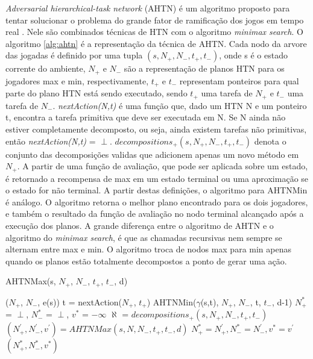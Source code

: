 \textit{Adversarial hierarchical-task network} (AHTN) é um algoritmo proposto para tentar solucionar o problema do grande fator de ramificação dos jogos em tempo real \cite{ontanon2015adversarial}. Nele são combinados técnicas de HTN com o algoritmo \textit{minimax search}. O algoritmo \ref{alg:ahtn} é a representação da técnica de AHTN. Cada nodo da arvore das jogadas é definido por uma tupla $(s, N_{+}, N_{-}, t_{+}, t_{-})$, onde s é o estado corrente do ambiente, $N_{+}$ e $N_{-}$ são a representação de planos HTN para os jogadores max e min, respectivamente, $t_{+}$ e $t_{-}$ representam ponteiros para qual parte do plano HTN está sendo executado, sendo  $t_{+}$ uma tarefa de $N_{+}$ e $t_{-}$ uma tarefa de $N_{-}$. \textit{nextAction(N,t)} é uma função que, dado um HTN N e um ponteiro t, encontra a tarefa primitiva que deve ser executada em N. Se N ainda não estiver completamente decomposto, ou seja, ainda existem tarefas não primitivas, então \textit{nextAction(N,t)} = $\perp$.  $decompositions_{+}(s, N_{+}, N_{-}, t_{+}, t_{-})$ denota o conjunto das decomposições validas que adicionem apenas um novo método em $N_{+}$. A partir de uma função de avaliação, que pode ser aplicada sobre um estado, é retornado a recompensa de max em um estado terminal ou uma aproximação se o estado for não terminal. A partir destas definições, o algoritmo para AHTNMin é análogo. O algoritmo retorna o melhor plano encontrado para os dois jogadores, e também o resultado da função de avaliação no nodo terminal alcançado após a execução dos planos. A grande diferença entre o algoritmo de AHTN e o algoritmo do \textit{minimax search}, é que as chamadas recursivas nem sempre se alternam entre max e min. O algoritmo troca de nodos max para min apenas quando os planos estão totalmente decompostos a ponto de gerar uma ação. 

\begin{algorithm}
	\caption{AHTNMax(s, $N_{+}$, $N_{-}$, $t_{+}$, $t_{-}$, d)}
	\label{alg:ahtn}
	\begin{algorithmic}[1]
		\State	\Return ($N_{+}$, $N_{-}$, e(s))
		\EndIf
		\State t = nextAction($N_{+}$, $t_{+}$) 
		\State \Return AHTNMin($\gamma$(s,t), $N_{+}$, $N_{-}$, t, $t_{-}$, d-1)
		\EndIf
		\State $N_{+}^{*}$ = $\perp$, $N_{-}^{*}$ = $\perp$, $v^{*}$ = $-\infty$
		\State $\aleph$ = $decompositions_{+}(s, N_{+}, N_{-}, t_{+}, t_{-})$
		\State $(N^{'}_{+}, N^{'}_{-}, v^{'}) = AHTNMax(s, N, N_{-}, t_{+}, t_{-}, d)$
		\State $N_{+}^{*} = N^{'}_{+}, N_{-}^{*} = N^{'}_{-}, v^{*} = v^{'} $
		\EndIf
		\EndFor		
		\State \Return $(N_{+}^{*}, N_{-}^{*}, v^{*} )$
	\end{algorithmic}
\end{algorithm}

